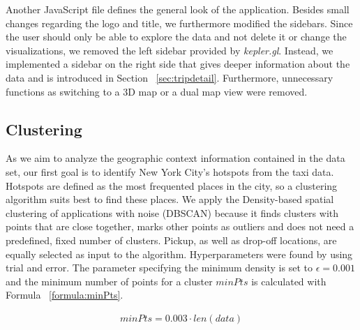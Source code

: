 \documentclass[sigconf, authorversion, nonacm=true]{acmart}
\begin{document}
Another JavaScript file defines the general look of the application. Besides small changes regarding the logo and title, we furthermore modified the sidebars. Since the user should only be able to explore the data and not delete it or change the visualizations, we removed the left sidebar provided by \textit{kepler.gl}. Instead, we implemented a sidebar on the right side that gives deeper information about the data and is introduced in Section ~\ref{sec:tripdetail}. Furthermore, unnecessary functions as switching to a 3D map or a dual map view were removed.



\subsection{Clustering}
\label{sec:cluster}

As we aim to analyze the geographic context information contained in the data set, our first goal is to identify New York City's hotspots from the taxi data. Hotspots are defined as the most frequented places in the city, so a clustering algorithm suits best to find these places. We apply the Density-based spatial clustering of applications with noise (DBSCAN) because it finds clusters with points that are close together, marks other points as outliers and does not need a predefined, fixed number of clusters. Pickup, as well as drop-off locations, are equally selected as input to the algorithm. Hyperparameters were found by using trial and error. The parameter specifying the minimum density is set to $\epsilon = 0.001$ and the minimum number of points for a cluster $minPts$ is calculated with Formula ~\ref{formula:minPts}. 

\begin{align}
\label{formula:minPts}
minPts = 0.003 \cdot len(data)
\end{align}
\end{document}
